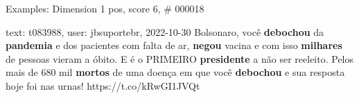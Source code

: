 \begin{frame}{Examples: Dimension 1 pos, score 6, \# 000018}
\footnotesize
\begin{exampleblock}{text: t083988, user: jbsuportebr, 2022-10-30}
Bolsonaro, você \textbf{debochou} da \textbf{pandemia} e dos pacientes com 
falta de ar, \textbf{negou} vacina e com isso \textbf{milhares} de pessoas 
vieram a óbito. E é o PRIMEIRO \textbf{presidente} a não ser reeleito. Pelos 
mais de 680 mil \textbf{mortos} de uma doença em que você \textbf{debochou} e 
sua resposta hoje foi nas urnas!   
https://t.co/kRwGI1JVQt 
\end{exampleblock}
\end{frame}
